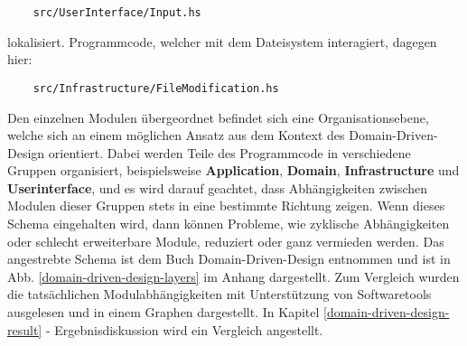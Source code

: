 \begin{verbatim}
    src/UserInterface/Input.hs
\end{verbatim}

lokalisiert. Programmcode, welcher mit dem Dateisystem interagiert, dagegen
hier:

\begin{verbatim}
    src/Infrastructure/FileModification.hs
\end{verbatim}

Den einzelnen Modulen übergeordnet befindet sich eine Organisationsebene, welche
sich an einem möglichen Ansatz aus dem Kontext des Domain-Driven-Design \cite{domain-driven-design}
orientiert. Dabei werden Teile des Programmcode in verschiedene Gruppen organisiert,
beispielsweise \textbf{Application}, \textbf{Domain}, \textbf{Infrastructure} und \textbf{Userinterface}, und es wird
darauf geachtet, dass Abhängigkeiten zwischen Modulen dieser Gruppen stets in
eine bestimmte Richtung zeigen. Wenn dieses Schema eingehalten wird, dann können
Probleme, wie zyklische Abhängigkeiten oder schlecht erweiterbare Module, reduziert
oder ganz vermieden werden. Das angestrebte Schema ist dem Buch Domain-Driven-Design \cite{domain-driven-design}
entnommen und ist in Abb. \ref{domain-driven-design-layers} im Anhang dargestellt.
Zum Vergleich wurden die tatsächlichen Modulabhängigkeiten mit Unterstützung von
Softwaretools \cite{graphmod} \cite{xdot} ausgelesen und in einem Graphen dargestellt.
In Kapitel \ref{domain-driven-design-result} - Ergebnisdiskussion wird ein Vergleich
angestellt.